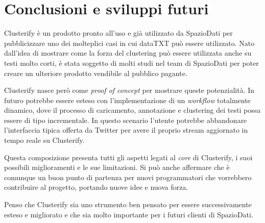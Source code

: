 \chapter{Conclusioni e sviluppi futuri}
	Clusterify è un prodotto pronto all'uso e già utilizzato da SpazioDati per pubblicizzare  uno dei molteplici casi in cui dataTXT può essere utilizzato. Nato dall'idea di mostrare come la forza del clustering può essere utilizzata anche su testi molto corti, è stata soggetto di molti studi nel team di SpazioDati per poter creare un ulteriore prodotto vendibile al pubblico pagante.

	Clusterify nasce però come \emph{proof of concept} per mostrare queste potenzialità. In futuro potrebbe essere esteso con l'implementazione di un \emph{workflow} totalmente dinamico, dove il processo di caricamento, annotazione e clustering dei testi possa essere di tipo incrementale. In questo scenario l'utente potrebbe abbandonare l'interfaccia tipica offerta da Twitter per avere il proprio stream aggiornato in tempo reale su Clusterify.

	Questa composizione presenta tutti gli aspetti legati al \emph{core} di Clusterify, i suoi possibili miglioramenti e le sue limitazioni. Si può anche affermare che è comunque un buon punto di partenza per nuovi programmatori che vorrebbero contribuire al progetto, portando nuove idee e nuova forza.

	Penso che Clusterify sia uno strumento ben pensato per essere successivamente esteso e migliorato e che sia molto importante per i futuri clienti di SpazioDati.